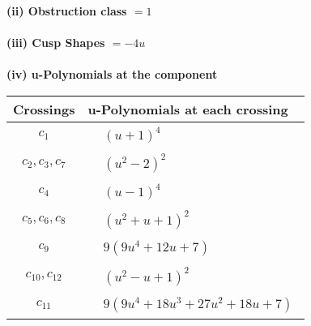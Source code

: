 \documentclass[1p]{elsarticle_modified}
\theoremstyle{definition}
\begin{document}
\flushleft \textbf{(ii) Obstruction class $= 1$}\\~\\
\flushleft \textbf{(iii) Cusp Shapes $= -4 u$}\\~\\
\newpage\renewcommand{\arraystretch}{1}
\flushleft \textbf{(iv) u-Polynomials at the component}\newline \\
\begin{tabular}{m{50pt}|m{274pt}}
Crossings & \hspace{64pt}u-Polynomials at each crossing \\
\hline $$\begin{aligned}c_{1}\end{aligned}$$&$\begin{aligned}
&(u+1)^4
\end{aligned}$\\
\hline $$\begin{aligned}c_{2},c_{3},c_{7}\end{aligned}$$&$\begin{aligned}
&(u^2-2)^2
\end{aligned}$\\
\hline $$\begin{aligned}c_{4}\end{aligned}$$&$\begin{aligned}
&(u-1)^4
\end{aligned}$\\
\hline $$\begin{aligned}c_{5},c_{6},c_{8}\end{aligned}$$&$\begin{aligned}
&(u^2+u+1)^2
\end{aligned}$\\
\hline $$\begin{aligned}c_{9}\end{aligned}$$&$\begin{aligned}
&9(9 u^4+12 u+7)
\end{aligned}$\\
\hline $$\begin{aligned}c_{10},c_{12}\end{aligned}$$&$\begin{aligned}
&(u^2- u+1)^2
\end{aligned}$\\
\hline $$\begin{aligned}c_{11}\end{aligned}$$&$\begin{aligned}
&9(9 u^4+18 u^3+27 u^2+18 u+7)
\end{aligned}$\\
\hline
\end{tabular}\\~\\
\end{document}

